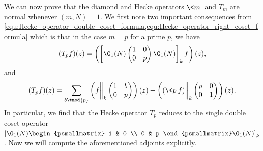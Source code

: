 \documentclass[12pt]{article}
\begin{document}
      We can now prove that the diamond and Hecke operators \(\<m\>\) and \(T_{m}\) are normal whenever \((m,N) = 1\). We first note two important consequences from \cref{equ:Hecke_operator_double_coset_formula,equ:Hecke_operator_right_coset_formula} which is that in the case \(m = p\) for a prime \(p\), we have
      \begin{equation}\label{equ:Hecke_operator_double_coset_formula_prime_case}
        (T_{p}f)(z) = \left(\left[\G_{1}(N)\begin{pmatrix} 1 & 0 \\ 0 & p \end{pmatrix}\G_{1}(N)\right]_{k}f\right)(z),
      \end{equation}
      and
      \begin{equation}\label{equ:Hecke_operator_right_coset_formula_prime_case}
        (T_{p}f)(z) = \sum_{b \tmod{p}}\left(f\bigg\|_{k}\begin{pmatrix} 1 & b \\ 0 & p \end{pmatrix}\right)(z)+\left((\<p\>f)\bigg\|_{k}\begin{pmatrix} p & 0 \\ 0 & 1 \end{pmatrix}\right)(z).
      \end{equation}
      In particular, we find that the Hecke operator \(T_{p}\) reduces to the single double coset operator \(\left[\G_{1}(N)\begin{psmallmatrix} 1 & 0 \\ 0 & p \end{psmallmatrix}\G_{1}(N)\right]_{k}\). Now we will compute the aforementioned adjoints explicitly.
\end{document}
